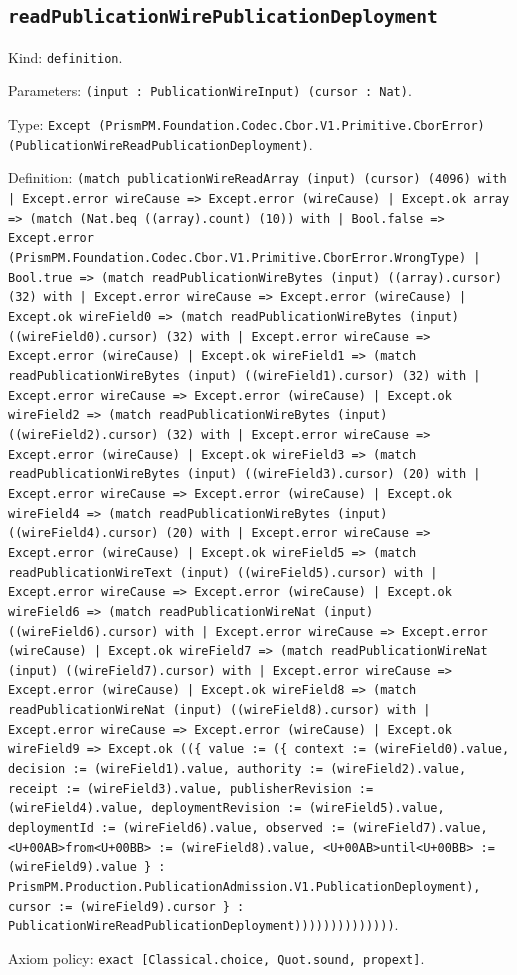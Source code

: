 \documentclass[11pt]{article}
\begin{document}
\subsection*{\texttt{readPublicationWirePublicationDeployment}}
\noindent Kind: \texttt{definition}.\par
\noindent Parameters: \texttt{(input : PublicationWireInput) (cursor : Nat)}.\par
\noindent Type: \texttt{Except (PrismPM.Foundation.Codec.Cbor.V1.Primitive.CborError) (PublicationWireReadPublicationDeployment)}.\par
\noindent Definition: \texttt{(match publicationWireReadArray (input) (cursor) (4096) with | Except.error wireCause => Except.error (wireCause) | Except.ok array => (match (Nat.beq ((array).count) (10)) with | Bool.false => Except.error (PrismPM.Foundation.Codec.Cbor.V1.Primitive.CborError.WrongType) | Bool.true => (match readPublicationWireBytes (input) ((array).cursor) (32) with | Except.error wireCause => Except.error (wireCause) | Except.ok wireField0 => (match readPublicationWireBytes (input) ((wireField0).cursor) (32) with | Except.error wireCause => Except.error (wireCause) | Except.ok wireField1 => (match readPublicationWireBytes (input) ((wireField1).cursor) (32) with | Except.error wireCause => Except.error (wireCause) | Except.ok wireField2 => (match readPublicationWireBytes (input) ((wireField2).cursor) (32) with | Except.error wireCause => Except.error (wireCause) | Except.ok wireField3 => (match readPublicationWireBytes (input) ((wireField3).cursor) (20) with | Except.error wireCause => Except.error (wireCause) | Except.ok wireField4 => (match readPublicationWireBytes (input) ((wireField4).cursor) (20) with | Except.error wireCause => Except.error (wireCause) | Except.ok wireField5 => (match readPublicationWireText (input) ((wireField5).cursor) with | Except.error wireCause => Except.error (wireCause) | Except.ok wireField6 => (match readPublicationWireNat (input) ((wireField6).cursor) with | Except.error wireCause => Except.error (wireCause) | Except.ok wireField7 => (match readPublicationWireNat (input) ((wireField7).cursor) with | Except.error wireCause => Except.error (wireCause) | Except.ok wireField8 => (match readPublicationWireNat (input) ((wireField8).cursor) with | Except.error wireCause => Except.error (wireCause) | Except.ok wireField9 => Except.ok ((\{ value := (\{ context := (wireField0).value, decision := (wireField1).value, authority := (wireField2).value, receipt := (wireField3).value, publisherRevision := (wireField4).value, deploymentRevision := (wireField5).value, deploymentId := (wireField6).value, observed := (wireField7).value, <U+00AB>from<U+00BB> := (wireField8).value, <U+00AB>until<U+00BB> := (wireField9).value \} : PrismPM.Production.PublicationAdmission.V1.PublicationDeployment), cursor := (wireField9).cursor \} : PublicationWireReadPublicationDeployment))))))))))))))}.\par
\noindent Axiom policy: \texttt{exact [Classical.choice, Quot.sound, propext]}.\par
\end{document}
